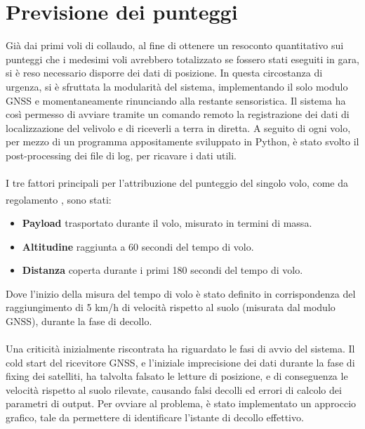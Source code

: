 \documentclass[12pt]{article}
\begin{document}
\section*{Previsione dei punteggi}
Già dai primi voli di collaudo, al fine di ottenere un resoconto quantitativo sui punteggi che i medesimi voli avrebbero totalizzato se fossero stati eseguiti in gara, si è reso necessario disporre dei dati di posizione. In questa circostanza di urgenza, si è sfruttata la modularità del sistema, implementando il solo modulo GNSS e momentaneamente rinunciando alla restante sensoristica. Il sistema ha così permesso di avviare tramite un comando remoto la registrazione dei dati di localizzazione del velivolo e di riceverli a terra in diretta. A seguito di ogni volo, per mezzo di un programma appositamente sviluppato in Python, è stato svolto il post-processing dei file di log, per ricavare i dati utili.
\\\\
I tre fattori principali per l'attribuzione del punteggio del singolo volo, come da regolamento \textsuperscript{\cite{regulation}}, sono stati:
\begin{itemize}
\item \textbf{Payload} trasportato durante il volo, misurato in termini di massa.
\item \textbf{Altitudine} raggiunta a 60 secondi del tempo di volo.
\item \textbf{Distanza} coperta durante i primi 180 secondi del tempo di volo.
\end{itemize}
Dove l'inizio della misura del tempo di volo è stato definito in corrispondenza del raggiungimento di 5 km/h di velocità rispetto al suolo (misurata dal modulo GNSS), durante la fase di decollo.
\\\\
Una criticità inizialmente riscontrata ha riguardato le fasi di avvio del sistema. Il cold start del ricevitore GNSS, e l'iniziale imprecisione dei dati durante la fase di fixing dei satelliti, ha talvolta falsato le letture di posizione, e di conseguenza le velocità rispetto al suolo rilevate, causando falsi decolli ed errori di calcolo dei parametri di output. Per ovviare al problema, è stato implementato un approccio grafico, tale da permettere di identificare l'istante di decollo effettivo.


\newpage


\end{document}

